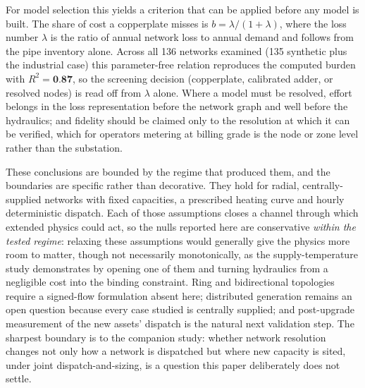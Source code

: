 For model selection this yields a criterion that can be applied before any model is built.
The share of cost a copperplate misses is $b = \lambda/(1+\lambda)$, where the loss number
$\lambda$ is the ratio of annual network loss to annual demand and follows from the pipe
inventory alone. Across all 136 networks examined (135 synthetic plus the industrial case)
this parameter-free relation reproduces the computed burden with $R^2 = \textbf{0.87}$, so the
screening decision (copperplate, calibrated adder, or resolved nodes) is read off from
$\lambda$ alone. Where a model must be resolved, effort belongs in the loss representation
before the network graph and well before the hydraulics; and fidelity should be claimed only to
the resolution at which it can be verified, which for operators metering at billing grade is
the node or zone level rather than the substation.

These conclusions are bounded by the regime that produced them, and the boundaries are
specific rather than decorative. They hold for radial, centrally-supplied networks with
fixed capacities, a prescribed heating curve and hourly deterministic dispatch. Each of
those assumptions closes a channel through which extended physics could act, so the nulls
reported here are conservative \emph{within the tested regime}: relaxing these assumptions would
generally give the physics more room to matter, though not necessarily monotonically, as the
supply-temperature study demonstrates by opening one of
them and turning hydraulics from a negligible cost into the binding constraint. Ring and
bidirectional topologies require a signed-flow formulation absent here; distributed
generation remains an open question because every case studied is centrally supplied; and
post-upgrade measurement of the new assets' dispatch is the natural next validation step.
The sharpest boundary is to the companion study: whether network resolution changes not only
how a network is dispatched but where new capacity is sited, under joint
dispatch-and-sizing, is a question this paper deliberately does not settle.
